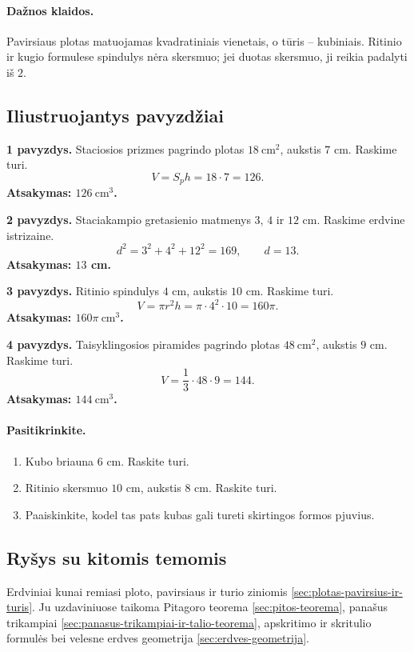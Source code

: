 \paragraph{Dažnos klaidos.}
Pavirsiaus plotas matuojamas kvadratiniais vienetais, o tūris -- kubiniais. Ritinio ir kugio formulese spindulys nėra skersmuo; jei duotas skersmuo, ji reikia padalyti iš $2$.

\subsection{Iliustruojantys pavyzdžiai}
\textbf{1 pavyzdys.} Staciosios prizmes pagrindo plotas $18\ \text{cm}^2$, aukstis $7$ cm. Raskime turi.
\[
V=S_p h=18\cdot7=126.
\]
\textbf{Atsakymas: $126\ \text{cm}^3$.}

\textbf{2 pavyzdys.} Staciakampio gretasienio matmenys $3$, $4$ ir $12$ cm. Raskime erdvine istrizaine.
\[
d^2=3^2+4^2+12^2=169,\qquad d=13.
\]
\textbf{Atsakymas: $13$ cm.}

\textbf{3 pavyzdys.} Ritinio spindulys $4$ cm, aukstis $10$ cm. Raskime turi.
\[
V=\pi r^2h=\pi\cdot4^2\cdot10=160\pi.
\]
\textbf{Atsakymas: $160\pi\ \text{cm}^3$.}

\textbf{4 pavyzdys.} Taisyklingosios piramides pagrindo plotas $48\ \text{cm}^2$, aukstis $9$ cm. Raskime turi.
\[
V=\frac13\cdot48\cdot9=144.
\]
\textbf{Atsakymas: $144\ \text{cm}^3$.}

\paragraph{Pasitikrinkite.}
\begin{enumerate}[label=\alph*)]
\item Kubo briauna $6$ cm. Raskite turi.
\item Ritinio skersmuo $10$ cm, aukstis $8$ cm. Raskite turi.
\item Paaiskinkite, kodel tas pats kubas gali tureti skirtingos formos pjuvius.
\end{enumerate}

\subsection{Ryšys su kitomis temomis}
Erdviniai kunai remiasi ploto, pavirsiaus ir turio ziniomis \ref{sec:plotas-pavirsius-ir-turis}. Ju uzdaviniuose taikoma Pitagoro teorema \ref{sec:pitos-teorema}, panašus trikampiai \ref{sec:panasus-trikampiai-ir-talio-teorema}, apskritimo ir skritulio formulės bei velesne erdves geometrija \ref{sec:erdves-geometrija}.


